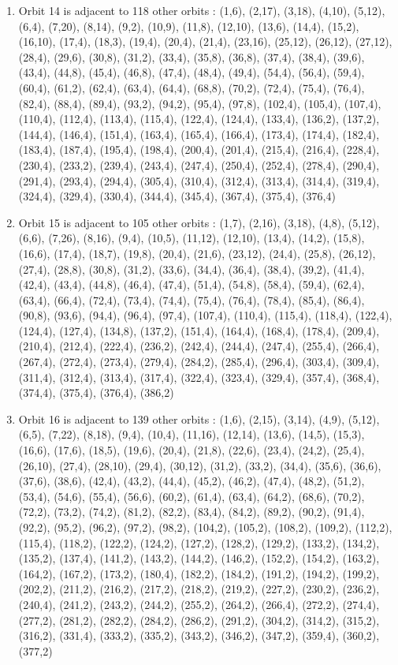 \documentclass[12pt]{article}
\begin{document}
\begin{enumerate}
\item Orbit 14 is adjacent to 118 other orbits : (1,6), (2,17), (3,18), (4,10), (5,12), (6,4), (7,20), (8,14), (9,2), (10,9), (11,8), (12,10), (13,6), (14,4), (15,2), (16,10), (17,4), (18,3), (19,4), (20,4), (21,4), (23,16), (25,12), (26,12), (27,12), (28,4), (29,6), (30,8), (31,2), (33,4), (35,8), (36,8), (37,4), (38,4), (39,6), (43,4), (44,8), (45,4), (46,8), (47,4), (48,4), (49,4), (54,4), (56,4), (59,4), (60,4), (61,2), (62,4), (63,4), (64,4), (68,8), (70,2), (72,4), (75,4), (76,4), (82,4), (88,4), (89,4), (93,2), (94,2), (95,4), (97,8), (102,4), (105,4), (107,4), (110,4), (112,4), (113,4), (115,4), (122,4), (124,4), (133,4), (136,2), (137,2), (144,4), (146,4), (151,4), (163,4), (165,4), (166,4), (173,4), (174,4), (182,4), (183,4), (187,4), (195,4), (198,4), (200,4), (201,4), (215,4), (216,4), (228,4), (230,4), (233,2), (239,4), (243,4), (247,4), (250,4), (252,4), (278,4), (290,4), (291,4), (293,4), (294,4), (305,4), (310,4), (312,4), (313,4), (314,4), (319,4), (324,4), (329,4), (330,4), (344,4), (345,4), (367,4), (375,4), (376,4)
\item Orbit 15 is adjacent to 105 other orbits : (1,7), (2,16), (3,18), (4,8), (5,12), (6,6), (7,26), (8,16), (9,4), (10,5), (11,12), (12,10), (13,4), (14,2), (15,8), (16,6), (17,4), (18,7), (19,8), (20,4), (21,6), (23,12), (24,4), (25,8), (26,12), (27,4), (28,8), (30,8), (31,2), (33,6), (34,4), (36,4), (38,4), (39,2), (41,4), (42,4), (43,4), (44,8), (46,4), (47,4), (51,4), (54,8), (58,4), (59,4), (62,4), (63,4), (66,4), (72,4), (73,4), (74,4), (75,4), (76,4), (78,4), (85,4), (86,4), (90,8), (93,6), (94,4), (96,4), (97,4), (107,4), (110,4), (115,4), (118,4), (122,4), (124,4), (127,4), (134,8), (137,2), (151,4), (164,4), (168,4), (178,4), (209,4), (210,4), (212,4), (222,4), (236,2), (242,4), (244,4), (247,4), (255,4), (266,4), (267,4), (272,4), (273,4), (279,4), (284,2), (285,4), (296,4), (303,4), (309,4), (311,4), (312,4), (313,4), (317,4), (322,4), (323,4), (329,4), (357,4), (368,4), (374,4), (375,4), (376,4), (386,2)
\item Orbit 16 is adjacent to 139 other orbits : (1,6), (2,15), (3,14), (4,9), (5,12), (6,5), (7,22), (8,18), (9,4), (10,4), (11,16), (12,14), (13,6), (14,5), (15,3), (16,6), (17,6), (18,5), (19,6), (20,4), (21,8), (22,6), (23,4), (24,2), (25,4), (26,10), (27,4), (28,10), (29,4), (30,12), (31,2), (33,2), (34,4), (35,6), (36,6), (37,6), (38,6), (42,4), (43,2), (44,4), (45,2), (46,2), (47,4), (48,2), (51,2), (53,4), (54,6), (55,4), (56,6), (60,2), (61,4), (63,4), (64,2), (68,6), (70,2), (72,2), (73,2), (74,2), (81,2), (82,2), (83,4), (84,2), (89,2), (90,2), (91,4), (92,2), (95,2), (96,2), (97,2), (98,2), (104,2), (105,2), (108,2), (109,2), (112,2), (115,4), (118,2), (122,2), (124,2), (127,2), (128,2), (129,2), (133,2), (134,2), (135,2), (137,4), (141,2), (143,2), (144,2), (146,2), (152,2), (154,2), (163,2), (164,2), (167,2), (173,2), (180,4), (182,2), (184,2), (191,2), (194,2), (199,2), (202,2), (211,2), (216,2), (217,2), (218,2), (219,2), (227,2), (230,2), (236,2), (240,4), (241,2), (243,2), (244,2), (255,2), (264,2), (266,4), (272,2), (274,4), (277,2), (281,2), (282,2), (284,2), (286,2), (291,2), (304,2), (314,2), (315,2), (316,2), (331,4), (333,2), (335,2), (343,2), (346,2), (347,2), (359,4), (360,2), (377,2)

\end{enumerate}
\end{document}
